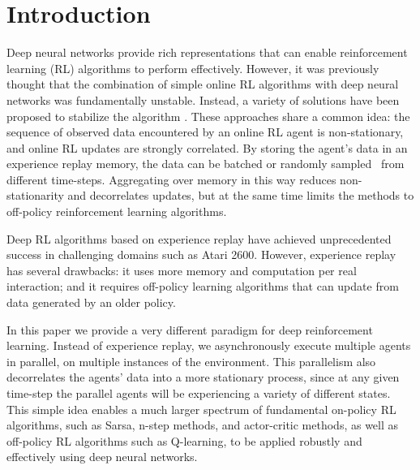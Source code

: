 %
\vspace{-0.1cm}
\section{Introduction}
\label{sec:intro}

Deep neural networks provide rich representations that can enable reinforcement learning (RL) algorithms to perform effectively.
However, it was previously thought that the combination of simple online RL algorithms with deep neural networks was fundamentally unstable.
Instead, a variety of solutions have been proposed to stabilize the algorithm \citep{riedmiller2005nfq,mnih-atari-2013,mnih-dqn-2015,hado2015doubledqn,schulman2015trust}.
These approaches share a common idea: the sequence of observed data encountered by an online RL agent is non-stationary, and online RL updates are strongly correlated.
By storing the agent's data in an experience replay memory, the data can be batched \citep{riedmiller2005nfq,schulman2015trust} or randomly sampled~\citep{mnih-atari-2013,mnih-dqn-2015,hado2015doubledqn} from different time-steps.
Aggregating over memory in this way reduces non-stationarity and decorrelates updates, but at the same time limits the methods to off-policy reinforcement learning algorithms.

Deep RL algorithms based on experience replay have achieved unprecedented success in challenging domains such as Atari 2600.
However, experience replay has several drawbacks: it uses more memory and computation per real interaction; and it requires off-policy learning algorithms that can update from data generated by an older policy.

In this paper we provide a very different paradigm for deep reinforcement learning.
Instead of experience replay, we asynchronously execute multiple agents in parallel, on multiple instances of the environment.
This parallelism also decorrelates the agents' data into a more stationary process, since at any given time-step the parallel agents will be experiencing a variety of different states.
This simple idea enables a much larger spectrum of fundamental on-policy RL algorithms, such as Sarsa, n-step methods, and actor-critic methods, as well as off-policy RL algorithms such as Q-learning, to be applied robustly and effectively using deep neural networks.

